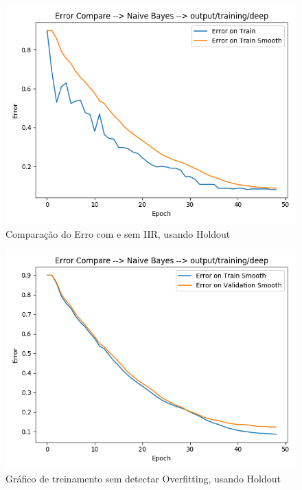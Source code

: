 \documentclass[
article,			%
11pt,				%
oneside,			%
a4paper,			%
english,			%
brazil,				%
sumario=tradicional,
]{abntex2}
\begin{document}
	\begin{anexosenv}
		
		\begin{figure}[htb]
			\caption{\label{fig_smooth_example} Comparação do Erro com e sem IIR, usando Holdout}
			\begin{center}
				\includegraphics[scale=0.5]{smooth_compare.png}
			\end{center}
		\end{figure}
		
		\begin{figure}[htb]
			\caption{\label{with_overfitting}Gráfico de treinamento sem detectar Overfitting, usando Holdout}
			\begin{center}
				\includegraphics[scale=0.5]{with_overfitting.png}
			\end{center}
		\end{figure}
		

\end{anexosenv}
\end{document}

